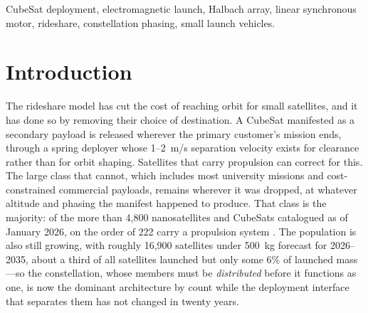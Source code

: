 \documentclass[conference]{IEEEtran}
\begin{document}
\begin{abstract}
invariant, and differential ejection velocities of 2--10~m/s establish 30$^\circ$ constellation spacing in 1.4--6.9 days against 25 days for differential-drag phasing under identical assumptions. The mass model closes the system at 76.5~kg dry and 124.5~kg loaded; its component lumps are not physical measurements. Host integration is developed generically for any restartable upper stage or hosted platform, with ISRO's POEM and Skyroot's Vikram-1 kick stage analyzed as candidate first hosts.
\end{abstract}

\begin{IEEEkeywords}
CubeSat deployment, electromagnetic launch, Halbach array, linear synchronous motor, rideshare, constellation phasing, small launch vehicles.
\end{IEEEkeywords}

\section{Introduction}
The rideshare model has cut the cost of reaching orbit for small satellites, and it has done so by removing their choice of destination. A CubeSat manifested as a secondary payload is released wherever the primary customer's mission ends, through a spring deployer whose 1--2~m/s separation velocity exists for clearance rather than for orbit shaping. Satellites that carry propulsion can correct for this. The large class that cannot, which includes most university missions and cost-constrained commercial payloads, remains wherever it was dropped, at whatever altitude and phasing the manifest happened to produce. That class is the majority: of the more than 4{,}800 nanosatellites and CubeSats catalogued as of January 2026, on the order of 222 carry a propulsion system \cite{nanosats}. The population is also still growing, with roughly 16{,}900 satellites under 500~kg forecast for 2026--2035, about a third of all satellites launched but only some 6\% of launched mass \cite{novaspace}---so the constellation, whose members must be \emph{distributed} before it functions as one, is now the dominant architecture by count while the deployment interface that separates them has not changed in twenty years.
\end{document}
